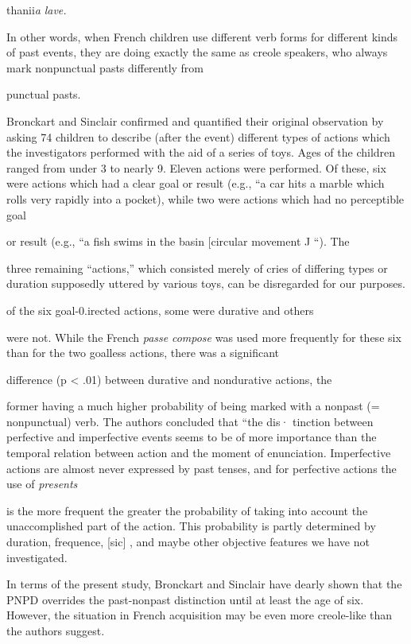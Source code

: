 thanii\textit{a} \textit{lave.}

In other words, when French children use different verb forms for different kinds of past events, they are doing exactly the same as creole speakers, who always mark nonpunctual pasts differently from

punctual pasts.

Bronckart and Sinclair confirmed and quantified their original observation by asking 74 children to describe (after the event) different types of actions which the investigators performed with the aid of a series of toys. Ages of the children ranged from under 3 to nearly 9. Eleven actions were performed. Of these, six were actions which had a clear goal or result (e.g., ``a car hits a marble which rolls very rapidly into a pocket{\textquotedbl}), while two were actions which had no perceptible goal

or result (e.g., ``a fish swims in the basin [circular movement J ``). The

three remaining ``actions,'' which consisted merely of cries of differing types or duration supposedly uttered by various toys, can be disre\-garded for our purposes.

of the six goal-0.irected actions, some were durative and others

were not. While the French \textit{passe} \textit{compose} was used more frequently for these six than for the two goalless actions, there was a significant

difference (p {\textless} .01) between durative and nondurative actions, the

former having a much higher probability of being marked with a nonpast (= nonpunctual) verb. The authors concluded that ``the dis· tinction between perfective and imperfective events seems to be of more importance than the temporal relation between action and the moment of enunciation. Imperfective actions are almost never ex\-pressed by past tenses, and for perfective actions the use of \textit{presents}

is the more frequent the greater the probability of taking into account the unaccomplished part of the action. This probability is partly determined by duration, frequence, [sic] , and maybe other objective features we have not investigated.{\textquotedbl}


In terms of the present study, Bronckart and Sinclair have dearly shown that the PNPD overrides the past-nonpast distinction until at least the age of six. However, the situation in French acquisi\-tion may be even more creole-like than the authors suggest.

